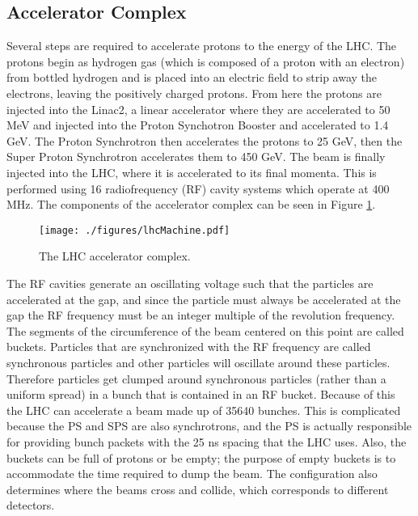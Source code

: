 \subsection{Accelerator Complex}

Several steps are required to accelerate protons to the energy of the LHC.  The protons begin as hydrogen gas (which is composed of a proton with an electron) from bottled hydrogen and is placed into an electric field to strip away the electrons, leaving the positively charged protons.  From here the protons are injected into the Linac2, a linear accelerator where they are accelerated to 50 MeV and injected into the Proton Synchotron Booster and accelerated to 1.4 GeV.  The Proton Synchrotron then accelerates the protons to 25 GeV, then the Super Proton Synchrotron accelerates them to 450 GeV.  The beam is finally injected into the LHC, where it is accelerated to its final momenta.  This is performed using 16 radiofrequency (RF) cavity systems which operate at 400 MHz.  The components of the accelerator complex can be seen in Figure \ref{fig:lhcMachine}.  \\

\begin{figure}[h!]
  \centering
	\texttt{[image: ./figures/lhcMachine.pdf]}
\caption{\label{fig:lhcMachine}{ The LHC accelerator complex\cite{LHC}. }}
\end{figure}

The RF cavities generate an oscillating voltage such that the particles are accelerated at the gap, and since the particle must always be accelerated at the gap the RF frequency must be an integer multiple of the revolution frequency.  The segments of the circumference of the beam centered on this point are called buckets.  Particles that are synchronized with the RF frequency are called synchronous particles and other particles will oscillate around these particles.  Therefore particles get clumped around synchronous particles (rather than a uniform spread) in a bunch that is contained in an RF bucket.  Because of this the LHC can accelerate a beam made up of 35640 bunches.  This is complicated because the PS and SPS are also synchrotrons, and the PS is actually responsible for providing bunch packets with the 25 ns spacing that the LHC uses.  Also, the buckets can be full of protons or be empty; the purpose of empty buckets is to accommodate the time required to dump the beam.  The configuration also determines where the beams cross and collide, which corresponds to different detectors.   \\ %

